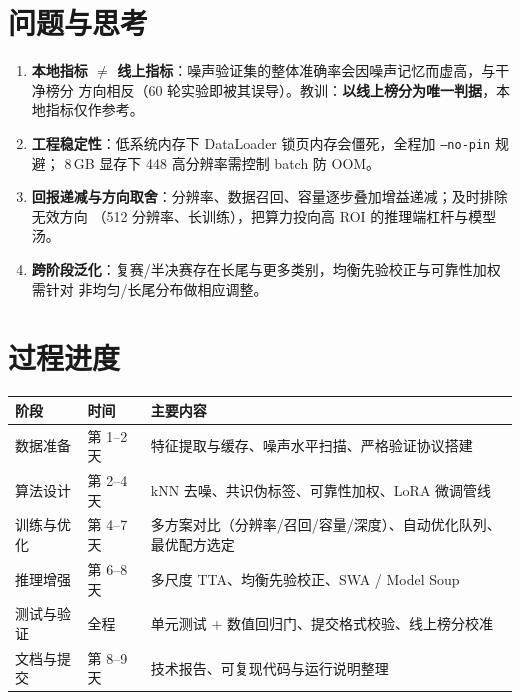 \documentclass[11pt]{ctexart}
\newcommand{\kw}[1]{\textbf{#1}}
\begin{document}
\section{问题与思考}
\begin{enumerate}[leftmargin=2em,itemsep=2pt]
  \item \kw{本地指标 $\ne$ 线上指标}：噪声验证集的整体准确率会因噪声记忆而虚高，与干净榜分
        方向相反（60 轮实验即被其误导）。教训：\kw{以线上榜分为唯一判据}，本地指标仅作参考。
  \item \kw{工程稳定性}：低系统内存下 DataLoader 锁页内存会僵死，全程加 \texttt{--no-pin} 规避；
        8\,GB 显存下 448 高分辨率需控制 batch 防 OOM。
  \item \kw{回报递减与方向取舍}：分辨率、数据召回、容量逐步叠加增益递减；及时排除无效方向
        （512 分辨率、长训练），把算力投向高 ROI 的推理端杠杆与模型汤。
  \item \kw{跨阶段泛化}：复赛/半决赛存在长尾与更多类别，均衡先验校正与可靠性加权需针对
        非均匀/长尾分布做相应调整。
\end{enumerate}

\section{过程进度}
\begin{center}
\begin{tabular}{@{}p{3.2cm}p{3.0cm}p{8.2cm}@{}}
\toprule
\kw{阶段} & \kw{时间} & \kw{主要内容} \\
\midrule
数据准备   & 第 1--2 天 & 特征提取与缓存、噪声水平扫描、严格验证协议搭建 \\
算法设计   & 第 2--4 天 & kNN 去噪、共识伪标签、可靠性加权、LoRA 微调管线 \\
训练与优化 & 第 4--7 天 & 多方案对比（分辨率/召回/容量/深度）、自动优化队列、最优配方选定 \\
推理增强   & 第 6--8 天 & 多尺度 TTA、均衡先验校正、SWA / Model Soup \\
测试与验证 & 全程       & 单元测试 + 数值回归门、提交格式校验、线上榜分校准 \\
文档与提交 & 第 8--9 天 & 技术报告、可复现代码与运行说明整理 \\
\bottomrule
\end{tabular}
\end{center}

\end{document}
